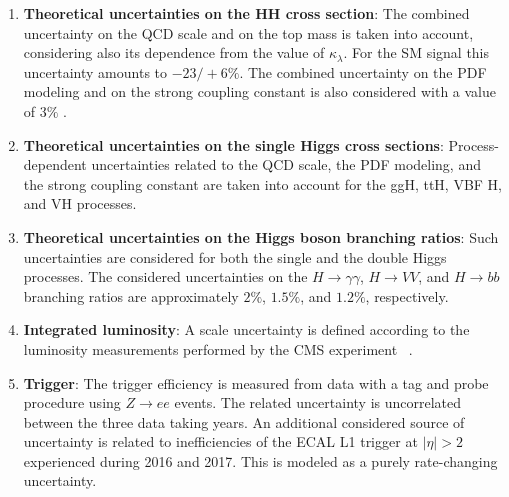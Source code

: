 \begin{enumerate}

  \item \textbf{Theoretical uncertainties on the HH cross section}: The combined uncertainty on the QCD scale and on the top mass is taken into account, considering also its dependence from the value of $\kappa_{\lambda}$. For the SM signal this uncertainty amounts to $-23/+6\% $. The combined uncertainty on the PDF modeling and on the strong coupling constant is also considered with a value of $3\% $ \cite{Grazzini:2018bsd}.

  \item \textbf{Theoretical uncertainties on the single Higgs cross sections}: Process-dependent uncertainties related to the QCD scale, the PDF modeling, and the strong coupling constant are taken into account for the ggH, ttH, VBF H, and VH processes.

  \item \textbf{Theoretical uncertainties on the Higgs boson branching ratios}: Such uncertainties are considered for both the single and the double Higgs processes. The considered uncertainties on the $H\rightarrow\gamma\gamma$, $H\rightarrow VV$, and $H\rightarrow bb$ branching ratios are approximately $2\% $, $1.5\% $, and $1.2\% $, respectively.

  \item \textbf{Integrated luminosity}: A scale uncertainty is defined according to the luminosity measurements performed by the CMS experiment ~\cite{CMS-LUM-17-003,CMS-PAS-LUM-17-004,CMS-PAS-LUM-18-002}.

  \item \textbf{Trigger}: The trigger efficiency is measured from data with a tag and probe procedure using $Z \rightarrow ee$ events. The related uncertainty is uncorrelated between the three data taking years. An additional considered source of uncertainty is related to inefficiencies of the ECAL L1 trigger at $|\eta|>2$ experienced during 2016 and 2017. This is modeled as a purely rate-changing uncertainty.



\end{enumerate}
